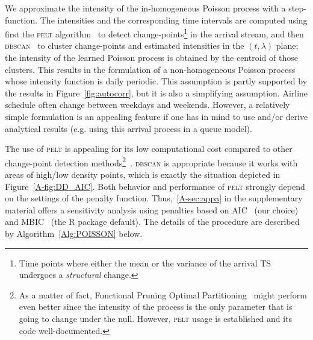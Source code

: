 \documentclass[draft,review]{elsarticle}
\newcommand{\PELT}{\textsc{pelt}}
\newcommand{\DBSCAN}{\textsc{dbscan}}
\begin{document}
We approximate the intensity of the in-homogeneous Poisson process with a step-function.
The intensities and the corresponding time intervals are computed using first the \PELT{} algorithm~\citep{killick2012optimal} to detect change-points\footnote{Time points where either the mean or the variance of the arrival \ac{TS} undergoes a \emph{structural} change.} in the arrival stream, and then \DBSCAN{}~\citep{ester1996density,pedregosa2011scikit} to cluster change-points and estimated intensities in the \((t, \lambda)\) plane; the intensity of the learned Poisson process is obtained by the centroid of those clusters.
This results in the formulation of a non-homogeneous Poisson process whose intensity function is daily periodic. This assumption is partly supported by the results in Figure~\ref{fig:autocorr}, but it is also a simplifying assumption. Airline schedule often change between weekdays and weekends. However, a relatively simple formulation is an appealing feature if one has in mind to use and/or derive analytical results (e.g. using this arrival process in a queue model).

The use of \PELT{} is appealing for its low computational cost compared to other change-point detection methods\footnote{As a matter of fact, Functional Pruning Optimal Partitioning~\citep{maidstone2017} might perform even better since the intensity of the process is the only parameter that is going to change under the null.
However, \PELT{} usage is established and its code well-documented.}~\citep{killick2012optimal}.
\DBSCAN{} is appropriate because it works with areas of high/low density points, which is exactly the situation depicted in Figure~\ref{A-fig:DD_AIC}.
Both behavior and performance of \PELT{} strongly depend on the settings of the penalty function.
Thus,~\ref{A-sec:appa} in the supplementary material offers a sensitivity analysis using penalties based on  \ac{AIC}~\citep{akaike1973information} (our choice) and \ac{MBIC}~\citep{zhang2007modified} (the R package default).
The details of the procedure are described by Algorithm~\ref{Alg:POISSON} below.

\end{document}
